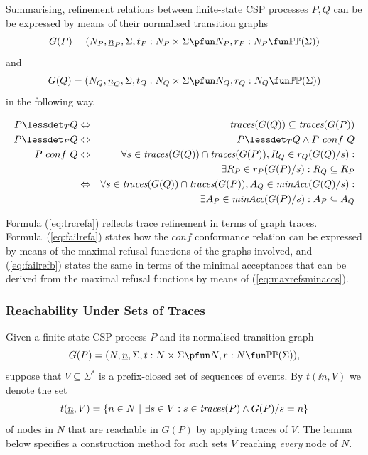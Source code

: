 Summarising, refinement relations between finite-state CSP processes $P, Q$ can be be
expressed by means of their normalised transition graphs 
$$G(P) = ( N_P, {\ii n}_P, \Sigma, t_P : N_P\times\Sigma \pfun N_P, r_P : N_P \fun \mathbb{P}\mathbb{P}(\Sigma))$$ 
and 
$$G(Q) = ( N_Q, {\ii n}_Q, \Sigma, t_Q : N_Q\times\Sigma \pfun N_Q, r_Q : N_Q \fun \mathbb{P}\mathbb{P}(\Sigma))$$
in the following
way. 
\begin{lemma}
  \label{lemma:tgtrcref}
  \begin{eqnarray}
  P \lessdet_T Q & \Leftrightarrow & \trc(G(Q)) \subseteq\trc(G(P))
  \label{eq:trcrefa}
  \\
  \label{eq:failconf}
  P \lessdet_F Q & \Leftrightarrow & P \lessdet_T Q \wedge P\ conf\ Q
  \\
  \label{eq:failrefa}
  P\ conf\ Q & \Leftrightarrow & \nonumber
  \forall s\in\trc(G(Q))\cap \trc(G(P)), R_Q\in r_Q(G(Q)/s):  \nonumber
  \\ & & \tabd
  \exists R_P\in r_P(G(P)/s): R_Q\subseteq R_P
  \\
  \label{eq:failrefb}
   & \Leftrightarrow & 
    \forall s\in\trc(G(Q))\cap \trc(G(P)), A_Q\in\minaccs(G(Q)/s):  \nonumber
   \\ & & \tabd
  \exists A_P\in\minaccs(G(P)/s): A_P\subseteq A_Q
 \end{eqnarray}
  \xbox
\end{lemma}
 
Formula (\ref{eq:trcrefa}) reflects trace refinement in terms of graph traces.  Formula~(\ref{eq:failrefa}) states how the $conf$ conformance relation can be expressed
by means of the maximal refusal functions of the graphs involved, and (\ref{eq:failrefb})
states the same in terms of the minimal acceptances that can be derived from the 
maximal refusal functions by means of (\ref{eq:maxrefsminaccs}). 



\subsubsection*{Reachability Under Sets of Traces}
\label{sec:V}
Given a finite-state CSP process $P$ and its normalised transition graph
\[
G(P) = ( N, \ii n, \Sigma, t : N\times\Sigma \pfun N, r : N \fun \mathbb{P}\mathbb{P}(\Sigma)),
\]
suppose that $V\subseteq\Sigma^*$ is a
prefix-closed set  of sequences of events. By $t(\ii n,V)$ we denote the set
\[
t(\underline{n},V) = \{ n\in N~|~\exists s\in V: s\in\text{\it traces}(P)\wedge G(P)/s = n \}
\]
of nodes in $N$ that are reachable in $G(P)$ by applying traces of $V$. The
lemma below specifies a construction method for such sets $V$ reaching {\it
every} node of $N$.

